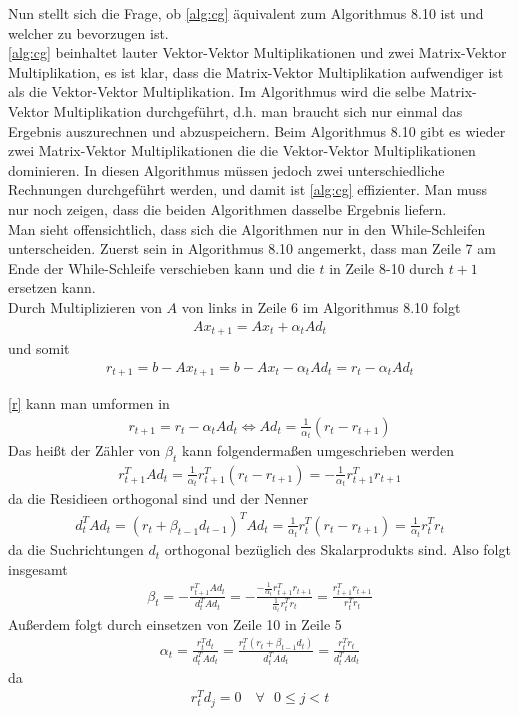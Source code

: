 \documentclass[12pt,a4paper]{scrartcl}
\numberwithin{equation}{section}
\numberwithin{myalgctr}{section}
\numberwithin{mytheoremctr}{subsection}
\numberwithin{mykorollarctr}{subsection}
\numberwithin{mylemmactr}{subsection}
\numberwithin{mybeispielctr}{subsection}
\begin{document}
		
	Nun stellt sich die Frage, ob \cref{alg:cg} äquivalent zum Algorithmus 8.10 \autocite[101]{skript} ist und welcher zu bevorzugen ist.\\
	\cref{alg:cg} beinhaltet lauter Vektor-Vektor Multiplikationen und zwei Matrix-Vektor Multiplikation, es ist klar, dass die Matrix-Vektor Multiplikation aufwendiger ist als die Vektor-Vektor Multiplikation. Im Algorithmus wird die selbe Matrix-Vektor Multiplikation durchgeführt, d.h. man braucht sich nur einmal das Ergebnis auszurechnen und abzuspeichern. Beim Algorithmus 8.10 gibt es wieder zwei Matrix-Vektor Multiplikationen die die Vektor-Vektor Multiplikationen dominieren. In diesen Algorithmus müssen jedoch zwei unterschiedliche Rechnungen durchgeführt werden, und damit ist \cref{alg:cg} effizienter. Man muss nur noch zeigen, dass die beiden Algorithmen dasselbe Ergebnis liefern.\\
	Man sieht offensichtlich, dass sich die Algorithmen nur in den While-Schleifen unterscheiden. Zuerst sein in Algorithmus 8.10 angemerkt, dass man Zeile 7 am Ende der While-Schleife verschieben kann und die $t$ in Zeile 8-10 durch $t + 1$ ersetzen kann. \\
	Durch Multiplizieren von $A$ von links in Zeile 6 im Algorithmus 8.10 folgt
	\begin{align*}
		Ax_{t+1} = Ax_t + \alpha_tAd_t
	\end{align*} 
	und somit
	\begin{align}\label{r}
		r_{t+1} = b - Ax_{t+1} = b - Ax_t - \alpha_tAd_t = r_t - \alpha_tAd_t
	\end{align}
	
	\cref{r} kann man umformen in 
	\begin{align*}
		r_{t+1} =  r_t - \alpha_tAd_t \Leftrightarrow Ad_t = \frac{1}{\alpha_t}(r_t - r_{t+1})
	\end{align*}
	Das heißt der Zähler von $\beta_t$ kann folgendermaßen umgeschrieben werden
	\begin{align*}
		r_{t+1}^{T}Ad_t = \frac{1}{\alpha_t}r_{t+1}^{T}(r_t - r_{t+1}) = -\frac{1}{\alpha_t}r_{t+1}^{T}r_{t+1}
	\end{align*}
	da die Residieen orthogonal sind und der Nenner
	\begin{align*}
		d_t^{T}Ad_t = (r_t + \beta_{t-1}d_{t-1})^{T}Ad_t =  \frac{1}{\alpha_t}r_{t}^{T}(r_t - r_{t+1}) = \frac{1}{\alpha_t}r_t^{T}r_t 
	\end{align*}
	da die Suchrichtungen $d_t$ orthogonal bezüglich des Skalarprodukts sind.
	Also folgt insgesamt
	\begin{align*}
		\beta_t = -\frac{r_{t+1}^{T}Ad_t}{d_t^{T}Ad_t} = -\frac{-\frac{1}{\alpha_t}r_{t+1}^{T}r_{t+1}}{\frac{1}{\alpha_t}r_t^{T}r_t } = \frac{r_{t+1}^{T}r_{t+1}}{r_t^{T}r_t }
	\end{align*}
	Außerdem folgt durch einsetzen von Zeile 10 in Zeile 5
	\begin{align*}
		\alpha_t = \frac{r_t^{T}d_t}{d_t^{T}Ad_t} = \frac{r_t^{T}(r_t + \beta_{t-1}d_t)}{d_t^{T}Ad_t} = \frac{r_t^{T}r_t}{d_t^{T}Ad_t}
	\end{align*}
	da \autocite[vgl.][100]{skript}
	\begin{align*}
		r_t^{T}d_j = 0 \quad \forall \text{ }0 \leq j < t
	\end{align*}
	
\end{document}
